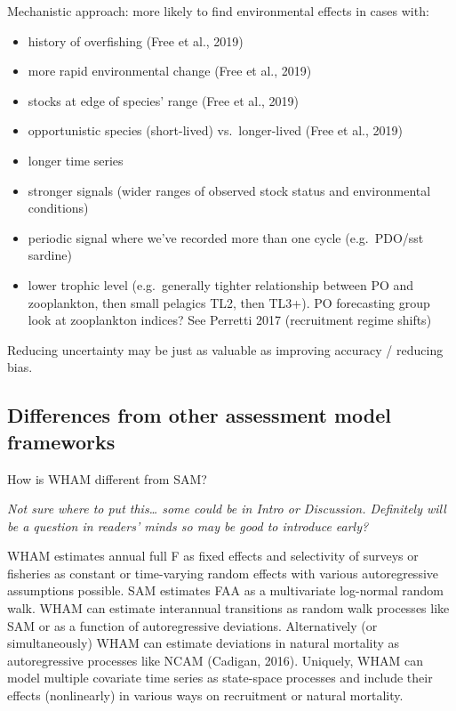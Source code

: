 \documentclass[]{article}
\providecommand{\tightlist}{%
  \setlength{\itemsep}{0pt}\setlength{\parskip}{0pt}}
\begin{document}
Mechanistic approach: more likely to find environmental effects in cases
with:

\begin{itemize}
\tightlist
\item
  history of overfishing (Free et al., 2019)
\item
  more rapid environmental change (Free et al., 2019)
\item
  stocks at edge of species' range (Free et al., 2019)
\item
  opportunistic species (short-lived) vs.~longer-lived (Free et al.,
  2019)
\item
  longer time series
\item
  stronger signals (wider ranges of observed stock status and
  environmental conditions)
\item
  periodic signal where we've recorded more than one cycle (e.g.~PDO/sst
  sardine)
\item
  lower trophic level (e.g.~generally tighter relationship between PO
  and zooplankton, then small pelagics TL2, then TL3+). PO forecasting
  group look at zooplankton indices? See Perretti 2017 (recruitment
  regime shifts)
\end{itemize}

Reducing uncertainty may be just as valuable as improving accuracy /
reducing bias.

\hypertarget{differences-from-other-assessment-model-frameworks}{%
\subsection{Differences from other assessment model
frameworks}\label{differences-from-other-assessment-model-frameworks}}

How is WHAM different from SAM?

\emph{Not sure where to put this\ldots{} some could be in Intro or
Discussion. Definitely will be a question in readers' minds so may be
good to introduce early?}

WHAM estimates annual full F as fixed effects and selectivity of surveys
or fisheries as constant or time-varying random effects with various
autoregressive assumptions possible. SAM estimates FAA as a multivariate
log-normal random walk. WHAM can estimate interannual transitions as
random walk processes like SAM or as a function of autoregressive
deviations. Alternatively (or simultaneously) WHAM can estimate
deviations in natural mortality as autoregressive processes like NCAM
(Cadigan, 2016). Uniquely, WHAM can model multiple covariate time series
as state-space processes and include their effects (nonlinearly) in
various ways on recruitment or natural mortality.
\end{document}
